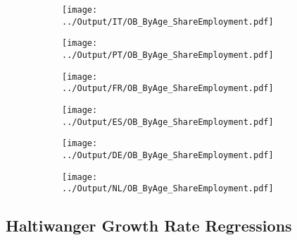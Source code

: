 \documentclass[12pt,notitlepage]{article}
\begin{document}
\begin{figure}[!htpb]
\centering
\begin{subfigure}{.49\textwidth}
    \centering
 \texttt{[image: ../Output/IT/OB\_ByAge\_ShareEmployment.pdf]}
\end{subfigure}%
\begin{subfigure}{.49\textwidth}
    \centering
 \texttt{[image: ../Output/PT/OB\_ByAge\_ShareEmployment.pdf]}
\end{subfigure}
\begin{subfigure}{.49\textwidth}
    \centering
 \texttt{[image: ../Output/FR/OB\_ByAge\_ShareEmployment.pdf]}
\end{subfigure}%
\begin{subfigure}{.49\textwidth}
    \centering
 \texttt{[image: ../Output/ES/OB\_ByAge\_ShareEmployment.pdf]}
\end{subfigure}
\begin{subfigure}{.49\textwidth}
    \centering
 \texttt{[image: ../Output/DE/OB\_ByAge\_ShareEmployment.pdf]}
\end{subfigure}
\begin{subfigure}{.49\textwidth}
    \centering
 \texttt{[image: ../Output/NL/OB\_ByAge\_ShareEmployment.pdf]}
\end{subfigure}
\end{figure}
\clearpage




\subsection{Haltiwanger Growth Rate Regressions}
\end{document}
